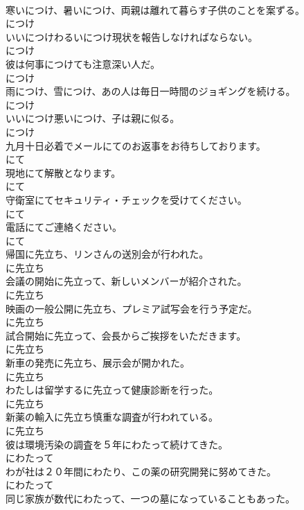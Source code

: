 \documentclass[8pt]{extreport}
\begin{document}
\begin{CJK}{UTF8}{min}
\\	寒いにつけ、暑いにつけ、両親は離れて暮らす子供のことを案ずる。	
\\	につけ
\\	いいにつけわるいにつけ現状を報告しなければならない。	
\\	につけ
\\	彼は何事につけても注意深い人だ。	
\\	につけ
\\	雨につけ、雪につけ、あの人は毎日一時間のジョギングを続ける。	
\\	につけ
\\	いいにつけ悪いにつけ、子は親に似る。	
\\	につけ
\\	九月十日必着でメールにてのお返事をお待ちしております。	
\\	にて
\\	現地にて解散となります。	
\\	にて
\\	守衛室にてセキュリティ・チェックを受けてください。	
\\	にて
\\	電話にてご連絡ください。	
\\	にて
\\	帰国に先立ち、リンさんの送別会が行われた。	
\\	に先立ち
\\	会議の開始に先立って、新しいメンバーが紹介された。	
\\	に先立ち
\\	映画の一般公開に先立ち、プレミア試写会を行う予定だ。	
\\	に先立ち
\\	試合開始に先立って、会長からご挨拶をいただきます。	
\\	に先立ち
\\	新車の発売に先立ち、展示会が開かれた。	
\\	に先立ち
\\	わたしは留学するに先立って健康診断を行った。	
\\	に先立ち
\\	新薬の輸入に先立ち慎重な調査が行われている。	
\\	に先立ち
\\	彼は環境汚染の調査を５年にわたって続けてきた。	
\\	にわたって
\\	わが社は２０年間にわたり、この薬の研究開発に努めてきた。	
\\	にわたって
\\	同じ家族が数代にわたって、一つの墓になっていることもあった。	

\end{CJK}
\end{document}
